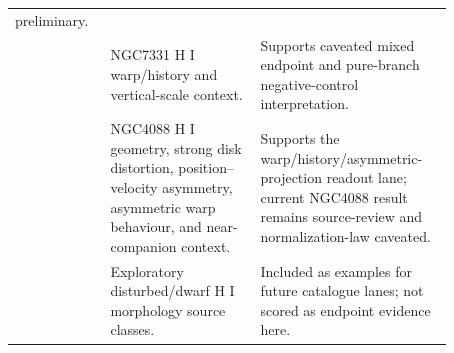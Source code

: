 \documentclass[11pt]{article}
\begin{document}
\begin{table}[H]
{\begin{tabular}{p{0.18\linewidth}p{0.31\linewidth}p{0.38\linewidth}}
preliminary.\\
\cite{Bosma1978NGC7331HI,Patra2018NGC7331ScaleHeight} &
NGC7331 H I warp/history and vertical-scale context. &
Supports caveated mixed endpoint and pure-branch negative-control interpretation.\\
\cite{VerheijenSancisi2001UrsaMajorHI} &
NGC4088 H I geometry, strong disk distortion, position--velocity asymmetry,
asymmetric warp behaviour, and near-companion context. &
Supports the warp/history/asymmetric-projection readout lane; current NGC4088
result remains source-review and normalization-law caveated.\\
\cite{deBlok2020IC2574HI,WalterBrinks1999IC2574Holes,SanchezSalcedo2002IC2574Holes,Swaters2009LateTypeDwarfs} &
Exploratory disturbed/dwarf H I morphology source classes. &
Included as examples for future catalogue lanes; not scored as endpoint evidence
here.\\
\bottomrule
\end{tabular}
}
\end{table}



\end{document}
